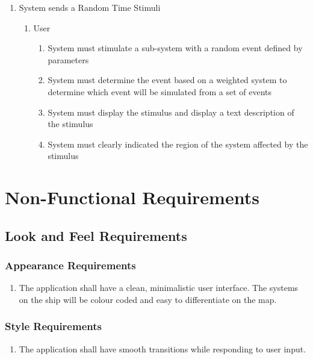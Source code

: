 \documentclass[12pt, titlepage]{article}
\begin{document}
\begin{enumerate}[{BE}1.]
	\item System sends a Random Time Stimuli
	\begin{enumerate}[{VP9}.1]
		\item User
			\begin{enumerate}
				\item System must stimulate a sub-system with a random event defined by parameters
				\item System must determine the event based on a weighted system to determine which event will be simulated from a set of events
				\item System must display the stimulus and display a text description of the stimulus
				\item System must clearly indicated the region of the system affected by the stimulus
			\end{enumerate}
	\end{enumerate}
	
	
\end{enumerate}



\section{Non-Functional Requirements}
\label{sec:non-functional_requirements}
\subsection{Look and Feel Requirements}
\label{sub:look_and_feel_requirements}

\subsubsection{Appearance Requirements}
\label{ssub:appearance_requirements}
\begin{enumerate}[{LF}1. ]
	\item The application shall have a clean, minimalistic user interface. The systems on the ship will be colour coded and easy to differentiate on the map.
\end{enumerate}

\subsubsection{Style Requirements}
\label{ssub:style_requirements}
\begin{enumerate}[{LF}1. ]
	\item The application shall have smooth transitions while responding to user input. 
\end{enumerate}
\end{document}
